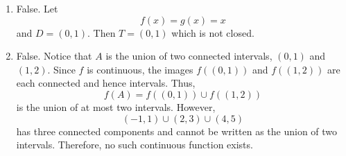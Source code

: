 \documentclass[12pt]{article}
\begin{document}
\begin{enumerate}[label=(\alph*)]
    \item False. Let
          \[
              f(x) = g(x) = x
          \]
          and \(D = (0,1) \). Then \(T = (0,1) \) which is not closed.

    \item False. Notice that \(A\) is the union of two connected intervals, \((0,1)\) and \((1,2)\). Since \(f\) is continuous, the images \(f((0,1))\) and \(f((1,2))\) are each connected and hence intervals.
          Thus,
          \[
              f(A)=f((0,1))\cup f((1,2))
          \]
          is the union of at most two intervals. However,
          \[
              (-1,1)\cup(2,3)\cup(4,5)
          \]
          has three connected components and cannot be written as the union of two intervals. Therefore, no such continuous function exists.
\end{enumerate}
\end{document}

